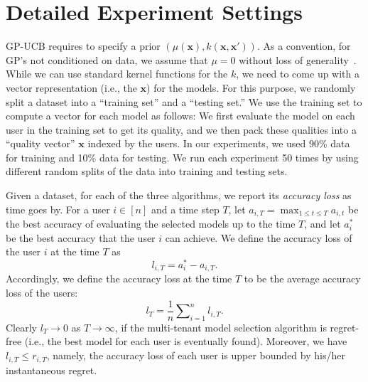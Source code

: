 \documentclass[letterpaper]{vldb}
\begin{document}



  



%
%
%
%
%
%
%
%
%
%
%
%
%
%
%
%
%
%
%
%
%
%
%
%
%
%
%
%
%
%
%
%
%
%
%
%
%
%
%
%
%
%
%
%
%
%



\iffalse

\appendix


\section{Detailed Experiment Settings}

GP-UCB requires to specify a prior $(\mu(\mathbf{x}), k(\mathbf{x},\mathbf{x}'))$.
As a convention, for GP's not conditioned on data, we assume that $\mu=0$ without loss of generality~\cite{SrinivasKKS10}.
While we can use standard kernel functions for the $k$, we need to come up with a vector representation (i.e., the $\mathbf{x}$) for the models.
For this purpose, we randomly split a dataset into a ``training set'' and a ``testing set.''
We use the training set to compute a vector for each model as follows:
We first evaluate the model on each user in the training set to get its quality, and we then pack these qualities into a ``quality vector'' $\mathbf{x}$ indexed by the users.
In our experiments, we used 90\% data for training and 10\% data for testing.
We run each experiment 50 times by using different random splits of the data into training and testing sets.

Given a dataset, for each of the three algorithms, we report its \emph{accuracy loss} as time goes by.
For a user $i\in[n]$ and a time step $T$, let $a_{i,T}=\max_{1\leq t\leq T} a_{i,t}$ be the best accuracy of evaluating the selected models up to the time $T$, and let $a_i^{*}$ be the best accuracy that the user $i$ can achieve.
We define the accuracy loss of the user $i$ at the time $T$ as
\begin{equation}
l_{i,T}=a_i^{*}-a_{i,T}.
\end{equation}
Accordingly, we define the accuracy loss at the time $T$ to be the average accuracy loss of the users:
\begin{equation}\label{eq:accuracy-loss}
l_T=\frac{1}{n}\sum\nolimits_{i=1}^{n}l_{i,T}.
\end{equation}
Clearly $l_T\to 0$ as $T\to\infty$, if the multi-tenant model selection algorithm is regret-free (i.e., the best model for each user is eventually found).
Moreover, we have $l_{i,T}\leq r_{i,T}$, namely, the accuracy loss of each user is upper bounded by his/her instantaneous regret.
\end{document}
